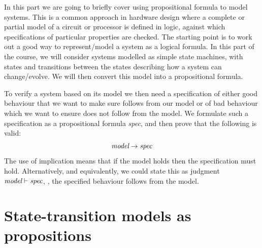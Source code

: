 \newcommand{\atomr}{\textsf{r}}
\newcommand{\atomrp}{\textsf{r'}}
\newcommand{\atomg}{\textsf{g}}
\newcommand{\atomgp}{\textsf{g'}}

In this part we are going to briefly cover using propositional
formula to model systems. This is a common approach in hardware design
where a complete or partial model of a circuit or processor is defined in logic,
against which specifications of particular properties are checked.
The starting point is to work out a good way to represent/model a
system as a logical formula. In this part of the course, we will
consider systems modelled as simple state machines, with states and
transitions between the states describing how a system can
change/evolve. We will then convert this model into a propositional
formula.


To verify a system based on its model we then need a specification of
either good behaviour that we want to make sure follows from our model
or of bad behaviour which we want to ensure does not follow from the
model.  We formulate such a specification as a propositional formula
\emph{spec}, and then prove that the following is valid:
%
\begin{equation*}
\emph{model} \rightarrow \emph{spec}
\end{equation*}
%
The use of implication means that if the model holds then
the specification must hold. Alternatively, and equivalently,
we could state this as judgment $\emph{model} \vdash \emph{spec}$,
\ie{}, the specified behaviour follows from the model.

\section{State-transition models as propositions}


